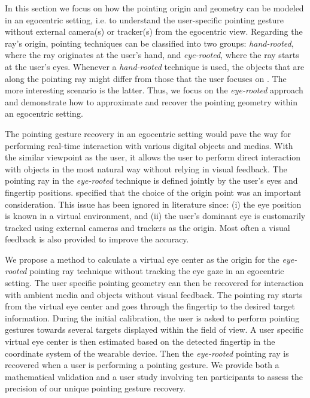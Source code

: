 
In this section we focus on how the pointing origin and geometry can be modeled in an egocentric setting, i.e. to understand the user-specific pointing gesture without external camera(s) or tracker(s) from the egocentric view. Regarding the ray's origin, pointing techniques can be classified into two groups: \textit{hand-rooted}, where the ray originates at the user's hand, and \textit{eye-rooted}, where the ray starts at the user's eyes. Whenever a \textit{hand-rooted} technique is used, the objects that are along the pointing ray might differ from those that the user focuses on \citep{Argelaguet2008}. The more interesting scenario is the latter. Thus, we focus on the \textit{eye-rooted} approach and demonstrate how to approximate and recover the pointing geometry within an egocentric setting.

The pointing gesture recovery in an egocentric setting would pave the way for performing real-time interaction with various digital objects and medias. 
With the similar viewpoint as the user, it allows the user to perform direct interaction with objects in the most natural way without relying in visual feedback. 
The pointing ray in the \textit{eye-rooted} technique is defined jointly by the user's eyes and fingertip positions.
\citet{Forsberg1996} specified that the choice of the origin point was an important consideration. This issue has been ignored in literature since: (i) the eye position is known in a virtual environment, and (ii) the user's dominant eye is customarily tracked using external cameras and trackers as the origin. Most often a visual feedback is also provided to improve the accuracy.

We propose a method to calculate a virtual eye center as the origin for the \textit{eye-rooted} pointing ray technique without tracking the eye gaze in an egocentric setting. The user specific pointing geometry can then be recovered for interaction with ambient media and objects without visual feedback. The pointing ray starts from the virtual eye center and goes through the fingertip to the desired target information. During the initial calibration, the user is asked to perform pointing gestures towards several targets displayed within the field of view. A user specific virtual eye center is then estimated based on the detected fingertip in the coordinate system of the wearable device. Then the \textit{eye-rooted} pointing ray is recovered when a user is performing a pointing gesture. We provide both a mathematical validation and a user study involving ten participants to assess the precision of our unique pointing gesture recovery.

